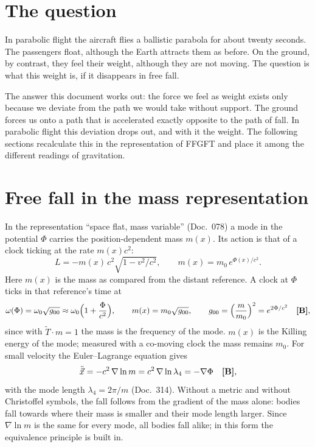 \section{The question}

In parabolic flight the aircraft flies a ballistic parabola for about twenty seconds. The
passengers float, although the Earth attracts them as before. On the ground, by contrast, they
feel their weight, although they are not moving. The question is what this weight is, if it
disappears in free fall.

The answer this document works out: the force we feel as weight exists only because we deviate
from the path we would take without support. The ground forces us onto a path that is accelerated
exactly opposite to the path of fall. In parabolic flight this deviation drops out, and with it
the weight. The following sections recalculate this in the representation of FFGFT and place it
among the different readings of gravitation.

\section{Free fall in the mass representation}

In the representation ``space flat, mass variable'' (Doc.~078) a mode in the potential $\Phi$
carries the position-dependent mass $m(x)$. Its action is that of a clock ticking at the rate
$m(x)c^2$:
\begin{equation}
L=-m(x)\,c^2\sqrt{1-v^2/c^2},\qquad m(x)=m_0\,e^{\Phi(x)/c^2}.
\end{equation}
Here $m(x)$ is the mass as compared from the distant reference. A clock at $\Phi$ ticks in that
reference's time at
\begin{equation}
\omega(\Phi)=\omega_0\sqrt{g_{00}}\approx\omega_0\Bigl(1+\frac{\Phi}{c^2}\Bigr),\qquad
m(x)=m_0\sqrt{g_{00}},\qquad g_{00}=\Bigl(\frac{m}{m_0}\Bigr)^2=e^{2\Phi/c^2}\quad\textbf{[B]},
\end{equation}
since with $\tilde T\cdot m=1$ the mass is the frequency of the mode. $m(x)$ is the Killing energy
of the mode; measured with a co-moving clock the mass remains $m_0$.
For small velocity the Euler--Lagrange equation gives
\begin{equation}
\ddot{\vec x}=-c^2\,\nabla\ln m=c^2\,\nabla\ln\lambda_4=-\nabla\Phi\quad\textbf{[B]},
\end{equation}
with the mode length $\lambda_4=2\pi/m$ (Doc.~314). Without a metric and without Christoffel
symbols, the fall follows from the gradient of the mass alone: bodies fall towards where their
mass is smaller and their mode length larger. Since $\nabla\ln m$ is the same for every mode, all
bodies fall alike; in this form the equivalence principle is built in.

